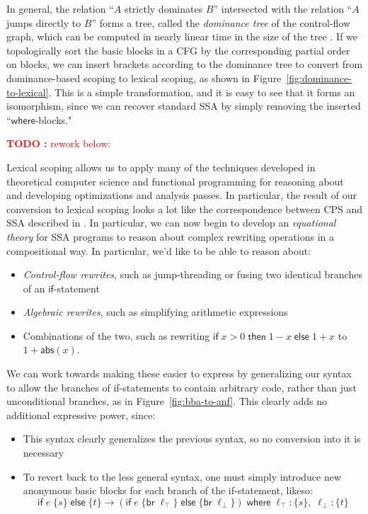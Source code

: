 \documentclass[acmsmall,screen,review]{acmart}
\newcounter{todos}
\newcommand{\TODO}[1]{{
  \stepcounter{todos}
  \begin{center}\large{\textcolor{red}{\textbf{TODO \arabic{todos}:} #1}}\end{center}
}}
\newcommand{\ms}[1]{\ensuremath{\mathsf{#1}}}
\begin{document}
In general, the relation ``$A$ strictly dominates $B$'' intersected with the relation ``$A$ jumps
directly to $B$'' forms a tree, called the \textit{dominance tree} of the control-flow graph, which
can be computed in nearly linear time in the size of the tree \cite{ssa-intro}. If we topologically
sort the basic blocks in a CFG by the corresponding partial order on blocks, we can insert brackets
according to the dominance tree to convert from dominance-based scoping to lexical scoping, as shown
in Figure~\ref{fig:dominance-to-lexical}. This is a simple transformation, and it is easy to see
that it forms an isomorphism, since we can recover standard SSA by simply removing the inserted
``\ms{where}-blocks."

\TODO{rework below:}

Lexical scoping allows us to apply many of the techniques developed in theoretical computer science
and functional programming for reasoning about and developing optimizations and analysis passes. In
particular, the result of our conversion to lexical scoping looks a lot like the correspondence
between CPS and SSA described in \citet{kelsey-95-cps}. In particular, we can now begin to develop
an \textit{equational theory} for SSA programs to reason about complex rewriting operations in a
compositional way. In particular, we'd like to be able to reason about:
\begin{itemize}
  \item \textit{Control-flow rewrites}, such as jump-threading or fusing two identical branches of
  an \ms{if}-statement
  \item \textit{Algebraic rewrites}, such as simplifying arithmetic expressions
  \item Combinations of the two, such as rewriting $\ms{if}\;x > 0\;\ms{then}\;1 - x\;\ms{else}\;1 +
  x$ to $1 + \ms{abs}(x)$.
\end{itemize}

We can work towards making these easier to express by generalizing our syntax to allow the branches
of if-statements to contain arbitrary code, rather than just unconditional branches, as in
Figure~\ref{fig:bba-to-anf}. This clearly adds no additional expressive power, since:
\begin{itemize}
  \item This syntax clearly generalizes the previous syntax, so no conversion into it is necessary
  \item To revert back to the less general syntax, one must simply introduce new anonymous basic
  blocks for each branch of the if-statement, likeso:
  \begin{equation}
    \ms{if}\;e\;\{s\}\;\ms{else}\;\{t\}
    \to (\ms{if}\;e\;\{\ms{br}\;\ell_\top\}\;\ms{else}\;\{\ms{br}\;\ell_\bot\})\;
        \ms{where}\;\ell_\top: \{s\},\;\ell_\bot: \{t\}
  \end{equation}
\end{itemize}
\end{document}
